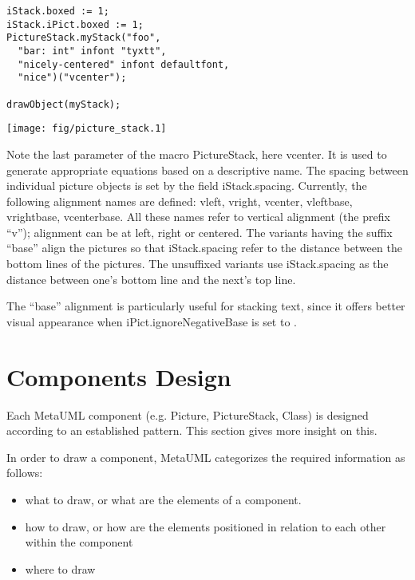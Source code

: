 \documentclass{article}
\newcommand{\code}{\ttfamily}
\begin{document}
\begin{multicols}{2}
\begin{verbatim}
iStack.boxed := 1;
iStack.iPict.boxed := 1;
PictureStack.myStack("foo",
  "bar: int" infont "tyxtt",
  "nicely-centered" infont defaultfont,
  "nice")("vcenter");

drawObject(myStack);
\end{verbatim}
\columnbreak
\hspace{1cm}\texttt{[image: fig/picture\_stack.1]}
\end{multicols}

Note the last parameter of the macro {\code PictureStack}, here {\code vcenter}.
It is used to generate appropriate equations based on a descriptive name.
The spacing between individual picture objects is set by the field
{\code iStack.spacing}. Currently, the following alignment names are
defined: {\code vleft}, {\code vright}, {\code vcenter},
{\code vleftbase}, {\code vrightbase}, {\code vcenterbase}. All these
names refer to vertical alignment (the prefix ``{\code v}''); alignment can
be at left, right or centered. The variants having the suffix ``{\code base}'' align
the pictures so that {\code iStack.spacing} refer to the distance between the
bottom lines of the pictures. The unsuffixed variants use {\code iStack.spacing} as
the distance between one's bottom line and the next's top line.

The ``{\code base}'' alignment is particularly useful for stacking text, since it
offers better visual appearance when {\code iPict.ignoreNegativeBase} is set to {\code 1}.

\section{Components Design}

Each MetaUML component (e.g. {\code Picture}, {\code PictureStack}, {\code Class}) is
designed according to an established pattern. This section gives more insight
on this.

In order to draw a component, MetaUML categorizes the required information as follows:
\begin{itemize}
\item what to draw, or what are the elements of a component.
\item how to draw, or how are the elements positioned in relation to each other within the component
\item where to draw
\end{itemize}
\end{document}
